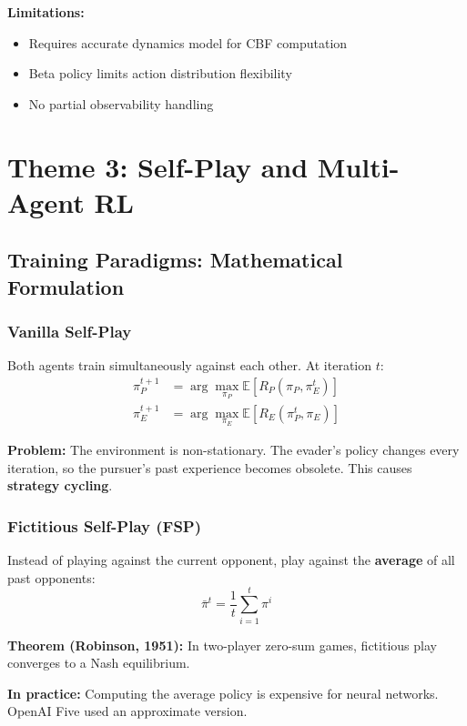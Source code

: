 \documentclass[11pt,a4paper]{report}
\begin{document}
\textbf{Limitations:}
\begin{itemize}
    \item Requires accurate dynamics model for CBF computation
    \item Beta policy limits action distribution flexibility
    \item No partial observability handling
\end{itemize}

\section{Theme 3: Self-Play and Multi-Agent RL}

\subsection{Training Paradigms: Mathematical Formulation}

\subsubsection{Vanilla Self-Play}
Both agents train simultaneously against each other. At iteration $t$:
\begin{align}
    \pi_P^{t+1} &= \arg\max_{\pi_P} \mathbb{E}[R_P(\pi_P, \pi_E^t)] \\
    \pi_E^{t+1} &= \arg\max_{\pi_E} \mathbb{E}[R_E(\pi_P^t, \pi_E)]
\end{align}

\textbf{Problem:} The environment is non-stationary. The evader's policy changes every iteration, so the pursuer's past experience becomes obsolete. This causes \textbf{strategy cycling}.

\subsubsection{Fictitious Self-Play (FSP)}

Instead of playing against the current opponent, play against the \textbf{average} of all past opponents:
\begin{equation}
    \bar{\pi}^t = \frac{1}{t} \sum_{i=1}^{t} \pi^i
\end{equation}

\textbf{Theorem (Robinson, 1951):} In two-player zero-sum games, fictitious play converges to a Nash equilibrium.

\textbf{In practice:} Computing the average policy is expensive for neural networks. OpenAI Five used an approximate version.
\end{document}
